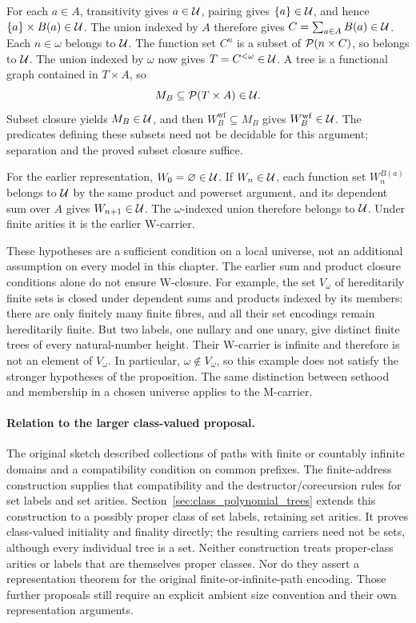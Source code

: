For each $a\in A$, transitivity gives $a\in\mathcal{U}$, pairing gives
$\{a\}\in\mathcal{U}$, and hence $\{a\}\times B(a)\in\mathcal{U}$.
The union indexed by $A$ therefore gives
$C=\sum_{a\in A}B(a)\in\mathcal{U}$. Each $n\in\omega$ belongs to $\mathcal{U}$.
The function set $C^n$ is a subset of $\mathcal{P}(n\times C)$, so belongs
to $\mathcal{U}$. The union indexed by $\omega$ now gives
$T=C^{<\omega}\in\mathcal{U}$. A tree is a functional graph contained in
$T\times A$, so
\[
M_B\subseteq\mathcal{P}(T\times A)\in\mathcal{U}.
\]
Subset closure yields $M_B\in\mathcal{U}$, and then
$W_B^{\mathrm{wf}}\subseteq M_B$ gives $W_B^{\mathrm{wf}}\in\mathcal{U}$.
The predicates defining these subsets need not be decidable for this
argument; separation and the proved subset closure suffice.

For the earlier representation, $W_0=\varnothing\in\mathcal{U}$.
If $W_n\in\mathcal{U}$, each function set $W_n^{B(a)}$ belongs to $\mathcal{U}$
by the same product and powerset argument, and its dependent sum over
$A$ gives $W_{n+1}\in\mathcal{U}$. The $\omega$-indexed union therefore
belongs to $\mathcal{U}$. Under finite arities it is the earlier W-carrier.
\Done

These hypotheses are a sufficient condition on a local universe, not
an additional assumption on every model in this chapter. The earlier
sum and product closure conditions alone do not ensure W-closure.
For example, the set $V_\omega$ of hereditarily finite sets is closed
under dependent sums and products indexed by its members: there are
only finitely many finite fibres, and all their set encodings remain
hereditarily finite. But two labels, one nullary and one unary, give
distinct finite trees of every natural-number height. Their W-carrier
is infinite and therefore is not an element of $V_\omega$. In particular,
$\omega\notin V_\omega$, so this example does not satisfy the stronger
hypotheses of the proposition. The same distinction between sethood
and membership in a chosen universe applies to the M-carrier.

\paragraph{Relation to the larger class-valued proposal.}
The original sketch described collections of paths with finite or
countably infinite domains and a compatibility condition on common
prefixes. The finite-address construction supplies that compatibility
and the destructor/corecursion rules for set labels and set arities.
Section~\ref{sec:class_polynomial_trees} extends this construction to a
possibly proper class of set labels, retaining set arities. It proves
class-valued initiality and finality directly; the resulting carriers
need not be sets, although every individual tree is a set. Neither
construction treats proper-class arities or labels that are themselves
proper classes. Nor do they assert a representation theorem for the
original finite-or-infinite-path encoding. Those further proposals still
require an explicit ambient size convention and their own representation
arguments.

